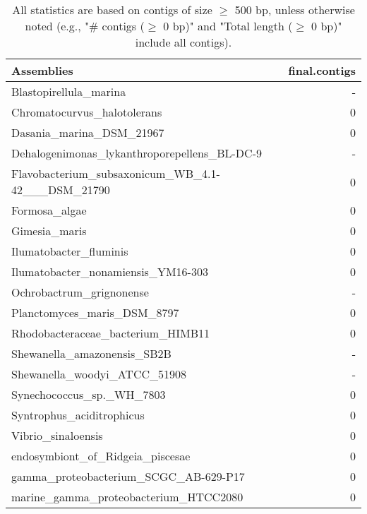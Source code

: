 \documentclass[12pt,a4paper]{article}
\begin{document}
\begin{table}[ht]
\begin{center}
\caption{All statistics are based on contigs of size $\geq$ 500 bp, unless otherwise noted (e.g., "\# contigs ($\geq$ 0 bp)" and "Total length ($\geq$ 0 bp)" include all contigs).}
\begin{tabular}{|l*{1}{|r}|}
\hline
Assemblies & final.contigs \\ \hline
Blastopirellula\_marina & - \\ \hline
Chromatocurvus\_halotolerans & 0 \\ \hline
Dasania\_marina\_DSM\_21967 & 0 \\ \hline
Dehalogenimonas\_lykanthroporepellens\_BL-DC-9 & - \\ \hline
Flavobacterium\_subsaxonicum\_WB\_4.1-42\_\_\_DSM\_21790 & 0 \\ \hline
Formosa\_algae & 0 \\ \hline
Gimesia\_maris & 0 \\ \hline
Ilumatobacter\_fluminis & 0 \\ \hline
Ilumatobacter\_nonamiensis\_YM16-303 & 0 \\ \hline
Ochrobactrum\_grignonense & - \\ \hline
Planctomyces\_maris\_DSM\_8797 & 0 \\ \hline
Rhodobacteraceae\_bacterium\_HIMB11 & 0 \\ \hline
Shewanella\_amazonensis\_SB2B & - \\ \hline
Shewanella\_woodyi\_ATCC\_51908 & - \\ \hline
Synechococcus\_sp.\_WH\_7803 & 0 \\ \hline
Syntrophus\_aciditrophicus & 0 \\ \hline
Vibrio\_sinaloensis & 0 \\ \hline
endosymbiont\_of\_Ridgeia\_piscesae & 0 \\ \hline
gamma\_proteobacterium\_SCGC\_AB-629-P17 & 0 \\ \hline
marine\_gamma\_proteobacterium\_HTCC2080 & 0 \\ \hline
\end{tabular}
\end{center}
\end{table}
\end{document}
